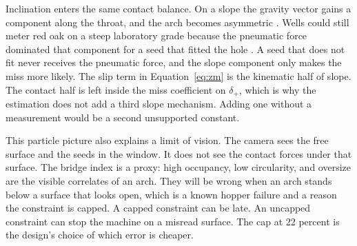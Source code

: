Inclination enters the same contact balance. On a slope the gravity vector gains a component along the throat, and the arch becomes asymmetric \cite{lei2022}. Wells could still meter red oak on a steep laboratory grade because the pneumatic force dominated that component for a seed that fitted the hole \cite{wells1990}. A seed that does not fit never receives the pneumatic force, and the slope component only makes the miss more likely. The slip term in Equation~\eqref{eq:zm} is the kinematic half of slope. The contact half is left inside the miss coefficient on $\delta_{+}$, which is why the estimation does not add a third slope mechanism. Adding one without a measurement would be a second unsupported constant.

This particle picture also explains a limit of vision. The camera sees the free surface and the seeds in the window. It does not see the contact forces under that surface. The bridge index is a proxy: high occupancy, low circularity, and oversize are the visible correlates of an arch. They will be wrong when an arch stands below a surface that looks open, which is a known hopper failure and a reason the constraint is capped. A capped constraint can be late. An uncapped constraint can stop the machine on a misread surface. The cap at 22 percent is the design's choice of which error is cheaper.
